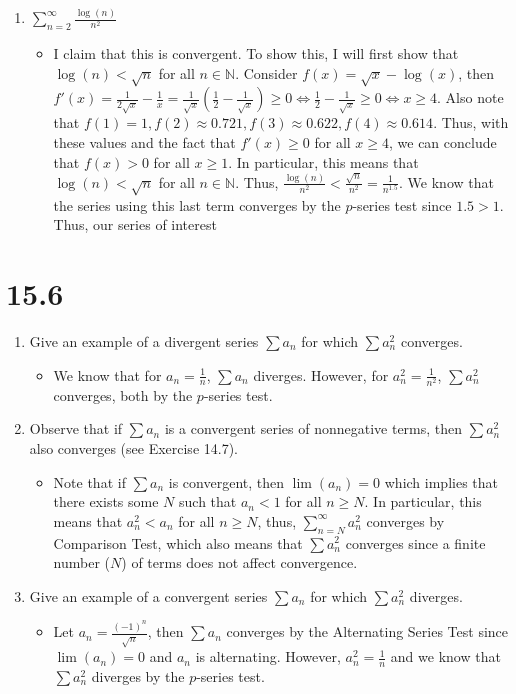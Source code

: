\documentclass[10pt,a4paper]{article}
\theoremstyle{definition}
\begin{document}
\begin{enumerate}[label = (\alph*)]
\begin{itemize}
	\end{itemize}
\item $\displaystyle \sum_{n = 2}^{\infty} \frac{\log(n)}{n^2}$
	\begin{itemize}
	\item I claim that this is convergent. To show this, I will first show that $\log(n) < \sqrt{n}$ for all $n \in \mathbb{N}$. Consider $f(x) = \sqrt{x} - \log(x)$, then $f'(x) = \frac{1}{2\sqrt{x}} - \frac{1}{x} = \frac{1}{\sqrt{x}}\left(\frac{1}{2} - \frac{1}{\sqrt{x}}\right) \geq 0 \iff \frac{1}{2} - \frac{1}{\sqrt{x}} \geq 0 \iff x \geq 4$. Also note that $f(1) = 1, f(2) \approx 0.721, f(3) \approx 0.622, f(4) \approx 0.614$. Thus, with these values and the fact that $f'(x) \geq 0$ for all $x \geq 4$, we can conclude that $f(x) > 0$ for all $x \geq 1$. In particular, this means that $\log(n) < \sqrt{n}$ for all $n \in \mathbb{N}$. Thus, $\frac{\log(n)}{n^2} < \frac{\sqrt{n}}{n^2} = \frac{1}{n^{1.5}}$. We know that the series using this last term converges by the $p$-series test since $1.5 > 1$. Thus, our series of interest 
	\end{itemize}
\end{enumerate}

\section*{15.6}
\begin{enumerate}[label = (\alph*)]
\item Give an example of a divergent series $\sum a_n$ for which $\sum a_n^2$ converges.
	\begin{itemize}
	\item We know that for $a_n = \frac{1}{n}$, $\sum a_n$ diverges. However, for $a_n^2 = \frac{1}{n^2}$, $\sum a_n^2$ converges, both by the $p$-series test.
	\end{itemize}
\item Observe that if $\sum a_n$ is a convergent series of nonnegative terms, then $\sum a_n^2$ also converges (see Exercise 14.7).
	\begin{itemize}
	\item Note that if $\sum a_n$ is convergent, then $\lim(a_n) = 0$ which implies that there exists some $N$ such that $a_n < 1$ for all $n \geq N$. In particular, this means that $a_n^2 < a_n$ for all $n \geq N$, thus, $\sum_{n = N}^{\infty} a_n^2$ converges by Comparison Test, which also means that $\sum a_n^2$ converges since a finite number ($N$) of terms does not affect convergence. 
	\end{itemize}
\item Give an example of a convergent series $\sum a_n$ for which $\sum a_n^2$ diverges. 
	\begin{itemize}
	\item Let $a_n = \frac{(-1)^n}{\sqrt{n}}$, then $\sum a_n$ converges by the Alternating Series Test since $\lim(a_n) = 0$ and $a_n$ is alternating. However, $a_n^2 = \frac{1}{n}$ and we know that $\sum a_n^2$ diverges by the $p$-series test.
	\end{itemize}
\end{enumerate}
\end{document}
